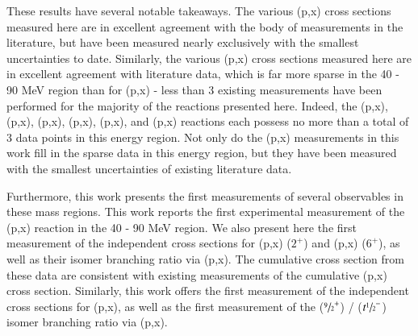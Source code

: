 \documentclass[3p]{elsarticle}
\begin{document}
These results have several notable takeaways.
The various (p,x) cross sections measured here are in excellent agreement with the body of measurements in the literature,  but have been measured nearly exclusively with the smallest uncertainties to date.
Similarly, the various (p,x) cross sections measured here are in excellent agreement with literature data, which is far more sparse in the 40 - 90 MeV region than for (p,x) -  less than 3 existing measurements have been performed for the majority of the reactions presented here.
Indeed,  the (p,x), (p,x), (p,x), (p,x), (p,x), and (p,x) reactions each possess no more than a total of 3 data points in this energy region.
Not only do the (p,x) measurements in this work fill in the sparse data in this energy region, but they have been measured with the smallest uncertainties of existing literature data.



Furthermore, this work presents the first measurements of several observables in these mass regions.
This work reports the first experimental measurement of the (p,x) reaction in the 40 - 90 MeV region.
We also present here the first measurement of the independent cross sections for    (p,x) ($2^+$) and  (p,x)  ($6^+$), as well as their  isomer branching ratio via (p,x).  
The cumulative cross section from these data are consistent with existing measurements of the cumulative (p,x) cross section.
Similarly, this work offers the first measurement of the independent cross sections for (p,x),  as well as the first measurement of the      ($\sfrac{9}{2}^+$) /   ($t\sfrac{1}{2}^-$) isomer branching ratio via (p,x).
\end{document}
